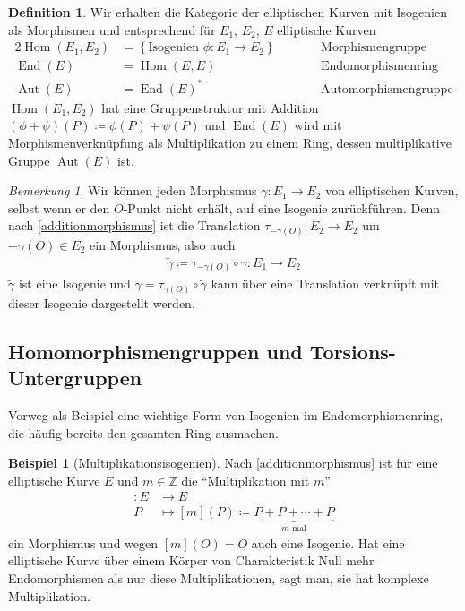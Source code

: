 \documentclass[english, german, parskip=half]{scrartcl}
\theoremstyle{definition}
\newtheorem{Definition}[Satz]{Definition}
\newtheorem{Beispiel}[Satz]{Beispiel}
\theoremstyle{remark}
\newtheorem{Bemerkung}[Satz]{Bemerkung}
\newcommand*{\Z}{\mathds{Z}}
\newcommand*{\longto}{\longrightarrow}
\renewcommand{\O}{O}
\DeclareMathOperator{\Hom}{Hom} %
\DeclareMathOperator{\End}{End} %
\DeclareMathOperator{\Aut}{Aut} %
\begin{document}
\begin{Definition}
  Wir erhalten die Kategorie der elliptischen Kurven mit Isogenien als
  Morphismen und entsprechend für $E_1$, $E_2$, $E$ elliptische Kurven
  \begin{alignat*}{2}
    \Hom(E_1, E_2)&=\left\{\text{Isogenien }\phi\colon E_1\to E_2 \right\}
    \qquad&&\text{Morphismengruppe}
    \\
    \End(E)&=\Hom(E,E)
    &&\text{Endomorphismenring}\\
    \Aut(E)&=\End(E)^*
    &&\text{Automorphismengruppe} 
  \end{alignat*}
  $\Hom(E_1, E_2)$ hat eine Gruppenstruktur mit Addition
  $(\phi+\psi)(P)\coloneqq \phi(P)+\psi(P)$ 
  und $\End(E)$ wird mit Morphismenverknüpfung als Multiplikation zu 
  einem Ring, dessen multiplikative Gruppe $\Aut(E)$ ist.
\end{Definition}

\begin{Bemerkung}
  Wir können jeden Morphismus $\gamma\colon E_1\to E_2$ von elliptischen
  Kurven, selbst wenn er den $\O$-Punkt nicht erhält, auf eine Isogenie
  zurückführen.
  Denn nach \autoref{additionmorphismus} ist die Translation
  $\tau_{-\gamma(\O)}\colon E_2\to E_2$ um $-\gamma(\O)\in E_2$
  ein Morphismus, also auch 
  \begin{gather*}
    \widetilde{\gamma}\coloneqq\tau_{-\gamma(\O)}\circ \gamma\colon E_1\to E_2
  \end{gather*}
  $\widetilde{\gamma}$ ist eine Isogenie und $\gamma=\tau_{\gamma(\O)}\circ \widetilde{\gamma}$ kann über
  eine Translation verknüpft mit dieser Isogenie dargestellt werden.
\end{Bemerkung}

\subsection{Homomorphismengruppen und Torsions-Untergruppen}
Vorweg als Beispiel eine wichtige Form von Isogenien im
Endomorphismenring, die häufig bereits den gesamten Ring ausmachen.
\begin{Beispiel}[Multiplikationsisogenien]
  Nach \autoref{additionmorphismus} ist für eine elliptische Kurve $E$
  und $m\in\Z$ die \enquote{Multiplikation mit $m$}
  \begin{align*}
    [m]\colon E &\longto E\\
    P&\longmapsto [m](P) \coloneqq
       \underbrace{P+P+\dotsb+P}_{m\text{-mal}}
  \end{align*}
  ein Morphismus und wegen $[m](\O)=\O$ auch eine Isogenie.
  Hat eine elliptische Kurve über einem Körper von Charakteristik Null
  mehr Endomorphismen als nur diese Multiplikationen, sagt man,
  sie hat komplexe Multiplikation.
\end{Beispiel}
\end{document}

